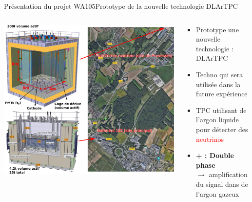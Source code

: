     \begin{frame}{Présentation du projet WA105}{Prototype de la nouvelle technologie DLArTPC}
        \begin{scriptsize}
            \begin{columns}
                \begin{column}{0.75\textwidth}
                    \centering
                    \includegraphics[height=0.9\textheight]{./pictures/wa105.png}
                \end{column}
                \begin{column}{0.25\textwidth}
                    \begin{itemize}
                        \item Prototype une nouvelle technologie : DLArTPC
                        \item Techno qui sera utilisée dans la future expérience \textcolor{red}{\dune{}}
                        \item TPC utilisant de l'argon liquide pour détecter des \textcolor{red}{neutrinos}
                        \item \textbf{+ : Double phase} \\$\to$ amplification du signal dans de l'argon gazeux
                    \end{itemize}
                \end{column}
            \end{columns}
        \end{scriptsize}
    \end{frame}
    
